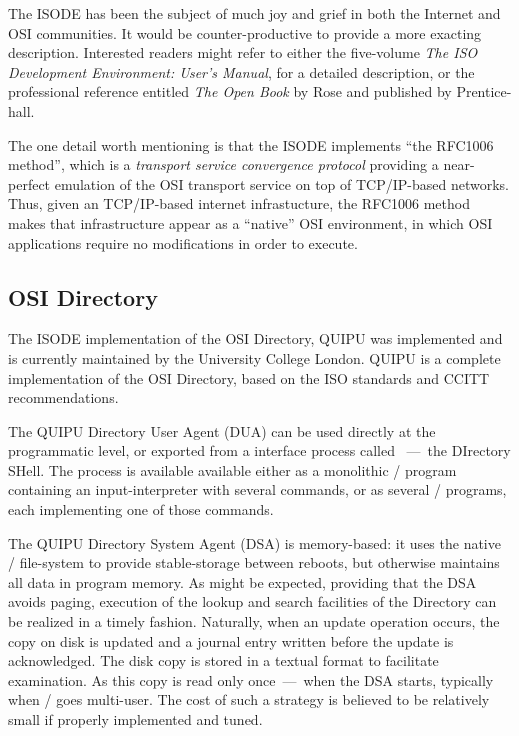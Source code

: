 The ISODE has been the subject of much joy and grief in both the Internet and
OSI communities.
It would be counter-productive to provide a more exacting description.
Interested readers might refer to either
the five-volume
{\em The ISO Development Environment: User's Manual},
for a detailed description,
or the professional reference entitled {\em The Open Book} by Rose and
published by Prentice-hall.

The one detail worth mentioning is that the ISODE implements
``the RFC1006 method'',
which is a {\em transport service convergence protocol} providing a 
near-perfect emulation of the OSI transport service on top of TCP/IP-based
networks.
Thus,
given an TCP/IP-based internet infrastucture,
the RFC1006 method makes that infrastructure appear as a ``native'' OSI
environment,
in which OSI applications require no modifications in order to execute.

\subsection	{OSI Directory}
The ISODE implementation of the OSI Directory,
QUIPU
was implemented and is currently maintained by the University College London.
QUIPU is a complete implementation of the OSI Directory,
based on the {\/} ISO standards and CCITT recommendations.

The QUIPU Directory User Agent (DUA) can be used directly at the programmatic
level,
or exported from a interface process called ~---~the DIrectory SHell.
The  process is available available either as a monolithic \unix/
program containing an input-interpreter with several commands,
or as several \unix/ programs, each implementing one of those commands.

The QUIPU Directory System Agent (DSA) is memory-based:
it uses the native \unix/ file-system to provide stable-storage between
reboots, but otherwise maintains all data in program memory.
As might be expected,
providing that the DSA avoids paging,
execution of the lookup and search facilities of the Directory can be realized
in a timely fashion.
Naturally, when an update operation occurs,
the copy on disk is updated and a journal entry written before the update is
acknowledged.
The disk copy is stored in a textual format to facilitate examination.
As this copy is read only once~---~when the DSA starts,
typically when \unix/ goes multi-user.
The cost of such a strategy is believed to be relatively small if properly
implemented and tuned.

